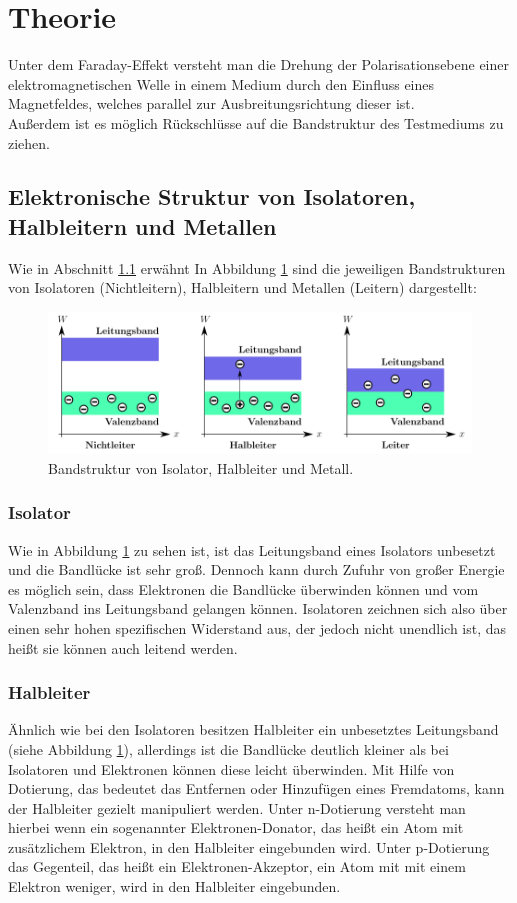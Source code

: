 \section{Theorie}
\label{sec:Theorie}
Unter dem Faraday-Effekt versteht man die Drehung der Polarisationsebene einer elektromagnetischen Welle in einem Medium durch den Einfluss eines Magnetfeldes, welches parallel zur Ausbreitungsrichtung dieser ist. \\
Außerdem ist es möglich Rückschlüsse auf die Bandstruktur des Testmediums zu ziehen.
\subsection{Elektronische Struktur von Isolatoren, Halbleitern und Metallen}
\label{sec:Isolatoren}
Wie in Abschnitt \ref{sec:Isolatoren} erwähnt
In Abbildung \ref{fig:leiter} sind die jeweiligen Bandstrukturen von Isolatoren (Nichtleitern), Halbleitern und Metallen (Leitern) dargestellt:
\begin{figure}
  \centering
  \includegraphics[scale=0.45]{fig/leiter.png}
  \caption{Bandstruktur von Isolator, Halbleiter und Metall. \cite{Bild5}}
  \label{fig:leiter}
\end{figure}
\subsubsection{Isolator}
Wie in Abbildung \ref{fig:leiter} zu sehen ist, ist das Leitungsband eines Isolators unbesetzt und die Bandlücke ist sehr groß. Dennoch kann durch Zufuhr von großer Energie es möglich sein, dass Elektronen die Bandlücke überwinden können und vom Valenzband ins Leitungsband gelangen können. Isolatoren zeichnen sich also über einen sehr hohen spezifischen Widerstand aus, der jedoch nicht unendlich ist, das heißt sie können auch leitend werden.
\subsubsection{Halbleiter}
Ähnlich wie bei den Isolatoren besitzen Halbleiter ein unbesetztes Leitungsband (siehe Abbildung \ref{fig:leiter}), allerdings ist die Bandlücke deutlich kleiner als bei Isolatoren und Elektronen können diese leicht überwinden. Mit Hilfe von Dotierung, das bedeutet das Entfernen oder Hinzufügen eines Fremdatoms, kann der Halbleiter gezielt manipuliert werden. Unter n-Dotierung versteht man hierbei wenn ein sogenannter Elektronen-Donator, das heißt ein Atom mit zusätzlichem Elektron, in den Halbleiter eingebunden wird. Unter p-Dotierung das Gegenteil, das heißt ein Elektronen-Akzeptor, ein Atom mit mit einem Elektron weniger, wird in den Halbleiter eingebunden.
